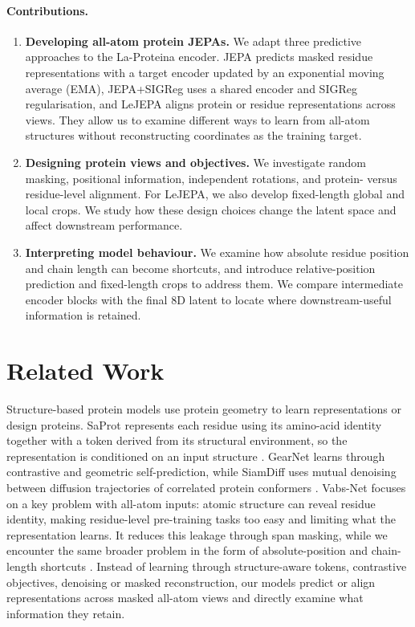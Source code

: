 \documentclass{article}
\begin{document}
\paragraph{Contributions.}
\begin{enumerate}
    \item \textbf{Developing all-atom protein JEPAs.} We adapt three predictive approaches to the La-Proteina encoder. JEPA predicts masked residue representations with a target encoder updated by an exponential moving average (EMA), JEPA+SIGReg uses a shared encoder and SIGReg regularisation, and LeJEPA aligns protein or residue representations across views. They allow us to examine different ways to learn from all-atom structures without reconstructing coordinates as the training target.
    \item \textbf{Designing protein views and objectives.} We investigate random masking, positional information, independent rotations, and protein- versus residue-level alignment. For LeJEPA, we also develop fixed-length global and local crops. We study how these design choices change the latent space and affect downstream performance.
    \item \textbf{Interpreting model behaviour.} We examine how absolute residue position and chain length can become shortcuts, and introduce relative-position prediction and fixed-length crops to address them. We compare intermediate encoder blocks with the final 8D latent to locate where downstream-useful information is retained.
\end{enumerate}

\section{Related Work}
\label{sec:related-work}

Structure-based protein models use protein geometry to learn representations or design proteins. SaProt represents each residue using its amino-acid identity together with a token derived from its structural environment, so the representation is conditioned on an input structure \citep{DBLP:conf/iclr/SuHZSZY24}. GearNet learns through contrastive and geometric self-prediction, while SiamDiff uses mutual denoising between diffusion trajectories of correlated protein conformers \citep{zhang2023protein,zhang2023siamdiff}. Vabs-Net focuses on a key problem with all-atom inputs: atomic structure can reveal residue identity, making residue-level pre-training tasks too easy and limiting what the representation learns. It reduces this leakage through span masking, while we encounter the same broader problem in the form of absolute-position and chain-length shortcuts \citep{DBLP:conf/icml/ZhaoZSLL24}. Instead of learning through structure-aware tokens, contrastive objectives, denoising or masked reconstruction, our models predict or align representations across masked all-atom views and directly examine what information they retain.
\end{document}

